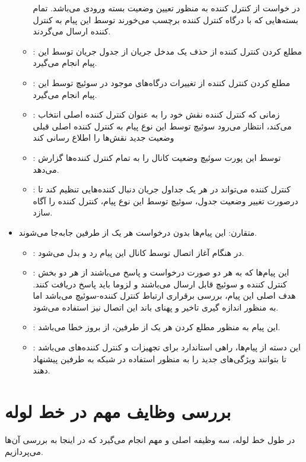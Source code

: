 \begin{itemize}
\begin{itemize}
		در خواست از کنترل کننده به منظور تعیین وضعیت بسته ورودی می‌باشد. تمام بسته‌هایی که با درگاه کنترل کننده برچسب می‌خورند توسط این پیام به کنترل کننده ارسال می‌گردند.
		\item {}:
		مطلع کردن کنترل کننده از حذف یک مدخل جریان از جدول جریان توسط این پیام انجام می‌گیرد.
		\item {}:
		مطلع کردن کنترل کننده از تغییرات درگاه‌های موجود در سوئیچ توسط این پیام انجام می‌گیرد.
		\item {}:
		زمانی که کنترل کننده نقش خود را به عنوان کنترل کننده اصلی انتخاب می‌کند، انتظار می‌رود سوئیچ توسط این نوع پیام به کنترل کننده اصلی قبلی وضعیت جدید نقش‌ها را اطلاع رسانی کند
		\item {}:
		توسط این پورت سوئیچ وضعیت کانال  را به تمام کنترل کننده‌ها گزارش می‌دهد.
		\item {}:
		کنترل کننده می‌تواند در هر یک جداول جریان دنبال‌ کننده‌هایی تنظیم کند تا درصورت تغییر وضعیت جدول، سوئیچ توسط این نوع پیام، کنترل کننده را آگاه سازد.
	\end{itemize}
	\item
	متقارن: این پیام‌ها بدون درخواست هر یک از طرفین جا‌به‌جا می‌شوند.
	\begin{itemize}
		\item {}:
		در هنگام آغاز اتصال توسط کانال  این پیام رد و بدل می‌شود. 
		\item {}:
		این پیام‌ها که به هر دو صورت درخواست و پاسخ می‌باشند از هر دو بخش کنترل کننده و سوئیچ قابل ارسال می‌باشند و لزوما باید پاسخ دریافت کنند. هدف اصلی این پیام، بررسی برقراری ارتباط کنترل کننده-سوئیچ می‌باشد اما به منظور اندازه گیری تاخیر و پهنای باند این اتصال نیز استفاده می‌شود.
		\item {}:
		این پیام به منظور مطلع کردن هر یک از طرفین، از بروز خطا می‌باشد.
		\item {}:
		این دسته از پیام‌ها، راهی استاندارد برای تجهیزات و کنترل کننده‌های  می‌باشد تا بتوانند ویژگی‌های جدید را به منظور استفاده در شبکه به طرفین پیشنهاد دهند.
	\end{itemize}
\end{itemize}

\section{بررسی وظایف مهم در خط لوله}
در طول خط لوله، سه وظیفه اصلی و مهم انجام می‌گیرد که در اینجا به بررسی آن‌ها می‌پردازیم.

